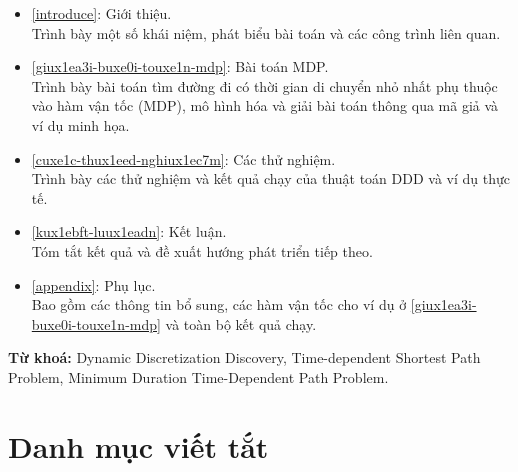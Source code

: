 \documentclass[fontsize=14pt,DIV=15pt,twoside=false]{scrbook}
\begin{document}
\begin{itemize}
    \item \autoref{introduce}: Giới thiệu.\\
        Trình bày một số khái niệm, phát biểu bài toán và các công trình liên quan.
    \item \autoref{giux1ea3i-buxe0i-touxe1n-mdp}: Bài toán MDP. \\
        Trình bày bài toán tìm đường đi có thời gian di chuyển nhỏ nhất phụ thuộc vào hàm vận tốc (MDP), mô hình hóa và giải bài toán thông qua mã giả và ví dụ minh họa.
    
    
    \item \autoref{cuxe1c-thux1eed-nghiux1ec7m}: Các thử nghiệm.\\
        Trình bày các thử nghiệm và kết quả chạy của thuật toán DDD và ví dụ thực tế.
    
    \item \autoref{kux1ebft-luux1eadn}: Kết luận.\\
        Tóm tắt kết quả và đề xuất hướng phát triển tiếp theo.
    \item \autoref{appendix}: Phụ lục.\\
        Bao gồm các thông tin bổ sung, các hàm vận tốc cho ví dụ ở \autoref{giux1ea3i-buxe0i-touxe1n-mdp} và toàn bộ kết quả chạy.

\end{itemize}

\textbf{Từ khoá:} Dynamic Discretization Discovery, Time-dependent Shortest Path Problem, Minimum Duration Time-Dependent Path Problem.

\chapter*{Danh mục viết tắt}\label{bang-ky-hieu}

\end{document}
